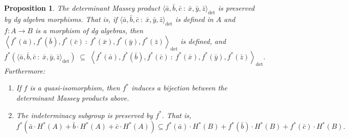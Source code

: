 \documentclass[11pt]{article}
\newtheorem{proposition}[theorem]{Proposition}
\theoremstyle{definition}
\theoremstyle{definition}
\begin{document}
\begin{proposition}
\label{prop: properties of the determinant Massey product}
The determinant Massey product $\langle \bar a,\bar b,\bar c \ :\ \bar x, \bar y, \bar z\rangle_{\det}$ is preserved by dg algebra morphisms.
That is, if $\langle \bar a,\bar b,\bar c \ :\ \bar x, \bar y, \bar z\rangle_{\det}$ is defined in $A$
and $f:A\to B$ is a morphism of dg algebras, 
then $\left\langle f^*(\bar a),f^*(\bar b),f^*(\bar c)\ : \ f^*(\bar x), f^*(\bar y), f^*(\bar z)\right\rangle_{\det}$ is defined, and 
\begin{equation*}
f^* \left(\langle \bar a,\bar b,\bar c \ :\ \bar x, \bar y, \bar z\rangle_{\det}\right) \;\subseteq\;
\left\langle f^*(\bar a),f^*(\bar b),f^*(\bar c) \ : \ f^*(\bar x), f^*(\bar y), f^*(\bar z)\right\rangle_{\det}.
\end{equation*}
Furthermore:
\begin{enumerate}
    \item If $f$ is a quasi-isomorphism, then $f^*$ induces a bijection between the determinant Massey products above.
    \item The indeterminacy subgroup is preserved by $f^*$. That is,
    \begin{equation*}
f^*\left(\bar a\cdot H^*(A) + \bar b\cdot H^*(A)+ \bar c \cdot H^*(A)\right) \subseteq 
f^*(\bar a)\cdot H^*(B) + f^*(\bar b)\cdot H^*(B)+ f^*(\bar c) \cdot H^*(B).
\end{equation*}
\end{enumerate}
\end{proposition}
\end{document}
